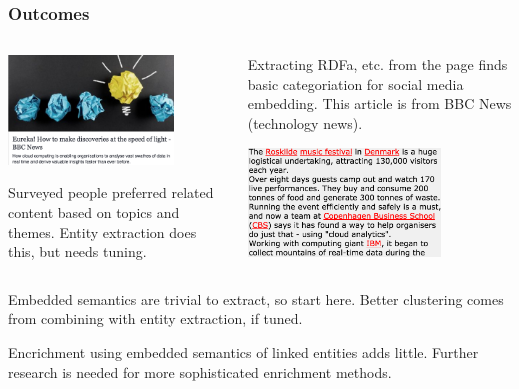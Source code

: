 \documentclass[10pt]{beamer}
\begin{document}
\begin{frame}
\frametitle{Outcomes}
  \begin{columns}
    \begin{column}{0.5\textwidth}

    \begin{center}

    \includegraphics[height=2.9cm]{facebook.png}

    \vspace{0.5cm}

    \small
    Surveyed people preferred related
    content based on topics and themes. Entity extraction does this, but
    needs tuning.

    \end{center}

    \end{column}
    \begin{column}{0.5\textwidth}

    \begin{center}

        \small
        Extracting RDFa, etc. from the page finds basic categoriation
        for social media embedding. This article is from BBC News (technology news).

    \vspace{0.5cm}

        \includegraphics[height=2.9cm]{entities.png}
    \end{center}

    \end{column}
  \end{columns}

    \vspace{0.5cm}

Embedded semantics are trivial to extract, so start here.
Better clustering comes from combining with entity extraction,
if tuned.

Encrichment using embedded semantics of linked entities adds little.
Further research is needed for more sophisticated enrichment methods.

\end{frame}
\end{document}
